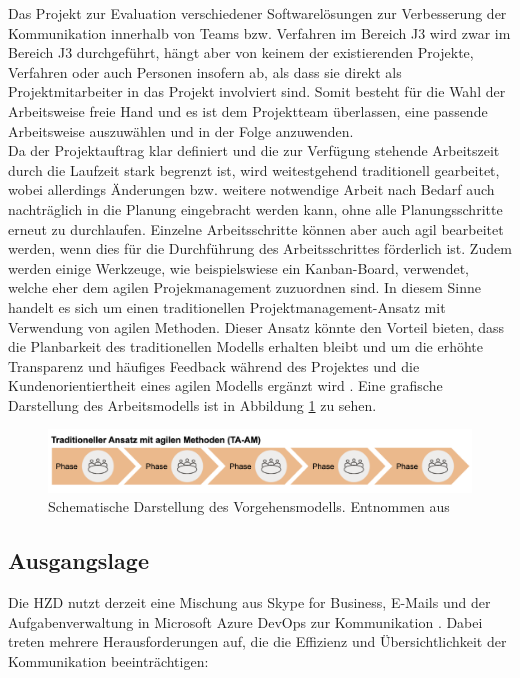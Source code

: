 \documentclass[ThesisDJ.tex]{subfiles}
\begin{document}
	Das Projekt zur Evaluation verschiedener Softwarelösungen zur Verbesserung der Kommunikation innerhalb von Teams bzw. Verfahren im Bereich J3 wird zwar im Bereich J3 durchgeführt, hängt aber von keinem der existierenden Projekte, Verfahren oder auch Personen insofern ab, als dass sie direkt als Projektmitarbeiter in das Projekt involviert sind. Somit besteht für die Wahl der Arbeitsweise freie Hand und es ist dem Projektteam überlassen, eine passende Arbeitsweise auszuwählen und in der Folge anzuwenden.\\
	Da der Projektauftrag klar definiert und die zur Verfügung stehende Arbeitszeit durch die Laufzeit stark begrenzt ist, wird weitestgehend traditionell gearbeitet, wobei allerdings Änderungen bzw. weitere notwendige Arbeit nach Bedarf auch nachträglich in die Planung eingebracht werden kann, ohne alle Planungsschritte erneut zu durchlaufen. Einzelne Arbeitsschritte können aber auch agil bearbeitet werden, wenn dies für die Durchführung des Arbeitsschrittes förderlich ist. Zudem werden einige Werkzeuge, wie beispielswiese ein Kanban-Board, verwendet, welche eher dem agilen Projekmanagement zuzuordnen sind. In diesem Sinne handelt es sich um einen 
  traditionellen Projektmanagement-Ansatz mit Verwendung von agilen Methoden. Dieser Ansatz könnte den Vorteil bieten, dass die Planbarkeit des traditionellen Modells erhalten bleibt und um die 
  erhöhte Transparenz und häufiges Feedback während des Projektes und die Kundenorientiertheit eines agilen Modells ergänzt wird \cite[S.~319ff]{dechange_projektmanagement_2024}.
  Eine grafische Darstellung des Arbeitsmodells ist in Abbildung \ref{fig:model} zu sehen.

  \begin{figure}[h!]
    \includegraphics[width=\textwidth]{modell.png}
    \centering
    \caption{Schematische Darstellung des Vorgehensmodells. Entnommen aus \cite[S.~319]{dechange_projektmanagement_2024}}
    \label{fig:model}
  \end{figure}
	
  \subsection{Ausgangslage}
  Die HZD nutzt derzeit eine Mischung aus Skype for Business, E-Mails und der Aufgabenverwaltung in Microsoft Azure DevOps zur Kommunikation \cite{microsoft_azure_nodate}. 
  Dabei treten mehrere Herausforderungen auf, die die Effizienz und Übersichtlichkeit der Kommunikation beeinträchtigen:
\end{document}
